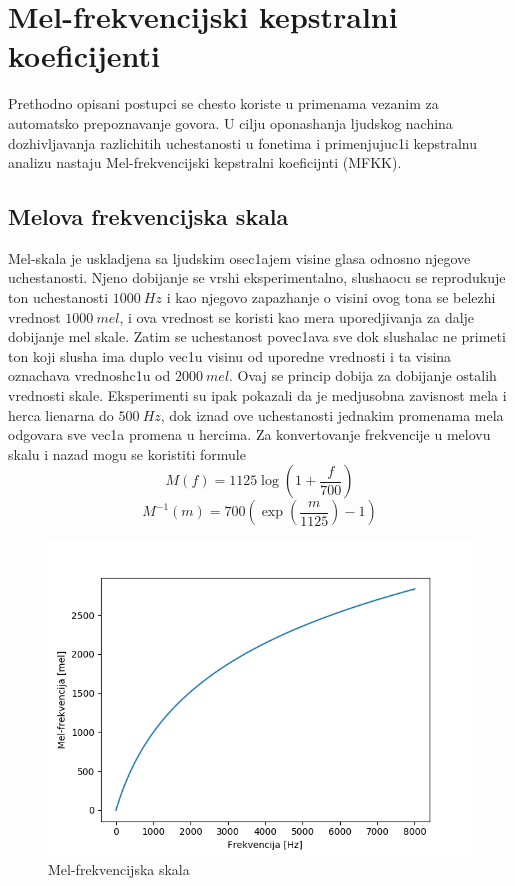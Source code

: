 \documentclass[a4paper, openany, oneside, 11pt]{book}
\begin{document}
\section{Mel-frekvencijski kepstralni koeficijenti}
Prethodno opisani postupci se chesto koriste u primenama vezanim za automat\-sko prepoznavanje govora. U cilju oponashanja ljudskog nachina dozhivljavanja razlichitih uchestanosti u fonetima i primenjujuc1i kepstralnu analizu nastaju Mel-frekvencijski kepstralni koeficijnti (MFKK). 
\subsection{Melova frekvencijska skala}
Mel-skala je uskladjena sa ljudskim osec1ajem visine glasa odnosno njegove uchestanosti. Njeno dobijanje se vrshi eksperimentalno, slushaocu se reprodukuje ton uchestanosti $\SI{1000}{Hz}$ i kao njegovo zapazhanje o visini ovog tona se belezhi vrednost $\SI{1000}{mel}$, i ova vrednost se koristi kao mera uporedjivanja za dalje dobijanje mel skale. Zatim se uchestanost povec1ava sve dok slushalac ne primeti ton koji slusha ima duplo vec1u visinu od uporedne vrednosti i ta visina oznachava vrednosh\-c1u od $\SI{2000}{mel}$. Ovaj se princip dobija za dobijanje ostalih vrednosti skale. Eksperimenti su ipak pokazali da je medjusobna zavisnost mela i herca lienarna do $\SI{500}{Hz}$, dok iznad ove uchestanosti jednakim promenama mela odgovara sve vec1a promena u hercima. Za konvertovanje frekvencije u melovu skalu i nazad mogu se koristiti formule
\begin{equation}\label{freq2mel}
M(f) = 1125\log\left(1+\frac{f}{700}\right)
\end{equation}
\begin{equation}\label{mel2freq}
M^{-1}(m) = 700\left(\exp\left(\frac{m}{1125}\right)-1\right)
\end{equation}
\begin{figure}[h!]
\centering
  \includegraphics[scale=0.8]{res/freq2mel.png}
  \caption{Mel-frekvencijska skala}
  \label{fig:1}
  \vspace{0pt}
\end{figure}
\end{document}

